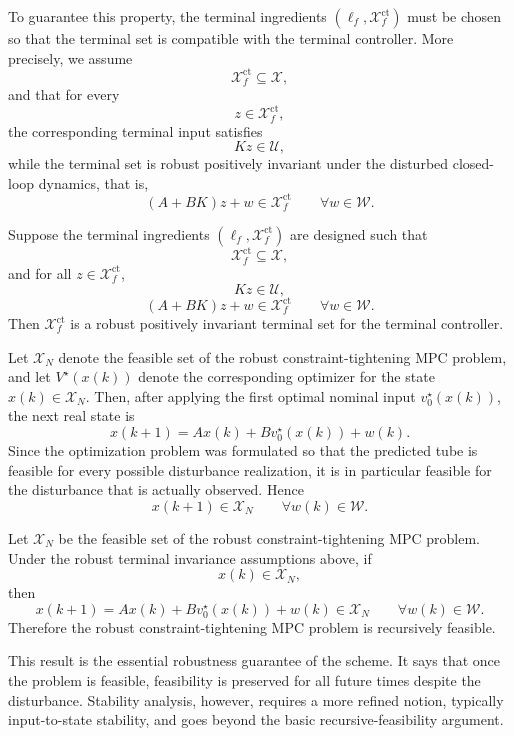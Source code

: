 To guarantee this property, the terminal ingredients \((\ell_f,\mathcal X_f^{\mathrm{ct}})\) must
be chosen so that the terminal set is compatible with the terminal controller. More precisely,
we assume
\[
    \mathcal X_f^{\mathrm{ct}}\subseteq \mathcal X,
\]
and that for every
\[
    z\in\mathcal X_f^{\mathrm{ct}},
\]
the corresponding terminal input satisfies
\[
    Kz\in\mathcal U,
\]
while the terminal set is robust positively invariant under the disturbed closed-loop dynamics,
that is,
\[
    (A+BK)z+w\in\mathcal X_f^{\mathrm{ct}}
    \qquad
    \forall w\in\mathcal W.
\]

\begin{theorembox}
Suppose the terminal ingredients \((\ell_f,\mathcal X_f^{\mathrm{ct}})\) are designed such that
\[
    \mathcal X_f^{\mathrm{ct}}\subseteq \mathcal X,
\]
and for all \(z\in\mathcal X_f^{\mathrm{ct}}\),
\[
    Kz\in\mathcal U,
\]
\[
    (A+BK)z+w\in\mathcal X_f^{\mathrm{ct}}
    \qquad
    \forall w\in\mathcal W.
\]
Then \(\mathcal X_f^{\mathrm{ct}}\) is a robust positively invariant terminal set for the
terminal controller.
\end{theorembox}

Let \(\mathcal X_N\) denote the feasible set of the robust constraint-tightening MPC problem,
and let \(V^\star(x(k))\) denote the corresponding optimizer for the state \(x(k)\in\mathcal X_N\).
Then, after applying the first optimal nominal input \(v_0^\star(x(k))\), the next real state is
\[
    x(k+1)=Ax(k)+Bv_0^\star(x(k))+w(k).
\]
Since the optimization problem was formulated so that the predicted tube is feasible for every
possible disturbance realization, it is in particular feasible for the disturbance that is actually
observed. Hence
\[
    x(k+1)\in\mathcal X_N
    \qquad
    \forall w(k)\in\mathcal W.
\]

\begin{theorembox}
Let \(\mathcal X_N\) be the feasible set of the robust constraint-tightening MPC problem.
Under the robust terminal invariance assumptions above, if
\[
    x(k)\in\mathcal X_N,
\]
then
\[
    x(k+1)=Ax(k)+Bv_0^\star(x(k))+w(k)\in\mathcal X_N
    \qquad
    \forall w(k)\in\mathcal W.
\]
Therefore the robust constraint-tightening MPC problem is recursively feasible.
\end{theorembox}

This result is the essential robustness guarantee of the scheme. It says that once the problem is
feasible, feasibility is preserved for all future times despite the disturbance. Stability analysis,
however, requires a more refined notion, typically input-to-state stability, and goes beyond the
basic recursive-feasibility argument.


